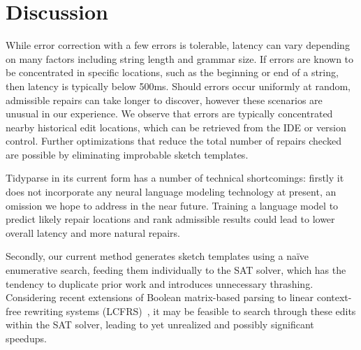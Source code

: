 \documentclass[sigplan,nonacm]{acmart}\settopmatter{printfolios=false,printccs=false,printacmref=false}
\begin{document}
\begin{figure}[H]
\hspace{-0.25cm}
\end{figure}

\section{Discussion}\label{sec:discussion}

While error correction with a few errors is tolerable, latency can vary depending on many factors including string length and grammar size. If errors are known to be concentrated in specific locations, such as the beginning or end of a string, then latency is typically below 500ms. Should errors occur uniformly at random, admissible repairs can take longer to discover, however these scenarios are unusual in our experience. We observe that errors are typically concentrated nearby historical edit locations, which can be retrieved from the IDE or version control. Further optimizations that reduce the total number of repairs checked are possible by eliminating improbable sketch templates.

Tidyparse in its current form has a number of technical shortcomings: firstly it does not incorporate any neural language modeling technology at present, an omission we hope to address in the near future. Training a language model to predict likely repair locations and rank admissible results could lead to lower overall latency and more natural repairs.

Secondly, our current method generates sketch templates using a na\"ive enumerative search, feeding them individually to the SAT solver, which has the tendency to duplicate prior work and introduces unnecessary thrashing. Considering recent extensions of Boolean matrix-based parsing to linear context-free rewriting systems (LCFRS)~\cite{cohen2016parsing}, it may be feasible to search through these edits within the SAT solver, leading to yet unrealized and possibly significant speedups.
\end{document}
